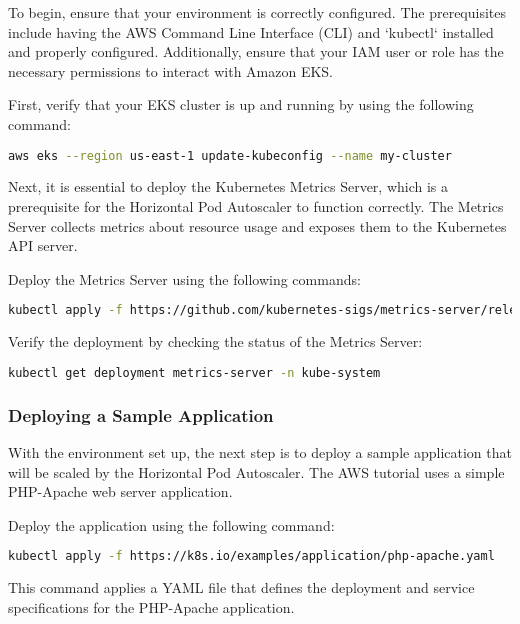 To begin, ensure that your environment is correctly configured. The prerequisites include having the AWS Command Line Interface (CLI) and `kubectl` installed and properly configured. Additionally, ensure that your IAM user or role has the necessary permissions to interact with Amazon EKS.

First, verify that your EKS cluster is up and running by using the following command:

\begin{lstlisting}[language=bash]
aws eks --region us-east-1 update-kubeconfig --name my-cluster
\end{lstlisting}

Next, it is essential to deploy the Kubernetes Metrics Server, which is a prerequisite for the Horizontal Pod Autoscaler to function correctly. The Metrics Server collects metrics about resource usage and exposes them to the Kubernetes API server.

Deploy the Metrics Server using the following commands:

\begin{lstlisting}[language=bash]
kubectl apply -f https://github.com/kubernetes-sigs/metrics-server/releases/latest/download/components.yaml
\end{lstlisting}

Verify the deployment by checking the status of the Metrics Server:

\begin{lstlisting}[language=bash]
kubectl get deployment metrics-server -n kube-system
\end{lstlisting}

\subsubsection{Deploying a Sample Application}

With the environment set up, the next step is to deploy a sample application that will be scaled by the Horizontal Pod Autoscaler. The AWS tutorial uses a simple PHP-Apache web server application.

Deploy the application using the following command:

\begin{lstlisting}[language=bash]
kubectl apply -f https://k8s.io/examples/application/php-apache.yaml
\end{lstlisting}

This command applies a YAML file that defines the deployment and service specifications for the PHP-Apache application.


